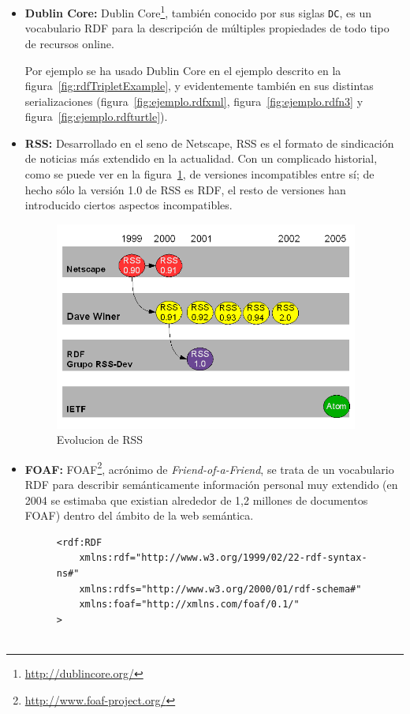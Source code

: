 \begin{itemize}
  \item \textbf{Dublin Core\label{sec:dc}:} Dublin Core\footnote{\url{http://dublincore.org/}}, 
	también conocido por sus siglas \texttt{DC}, es un vocabulario RDF para la descripción 
	de múltiples propiedades de todo tipo de recursos online.

	Por ejemplo se ha usado Dublin Core en el ejemplo descrito en la 
	figura~\ref{fig:rdfTripletExample}, y evidentemente también en sus distintas 
	serializaciones (figura~\ref{fig:ejemplo.rdfxml}, figura~\ref{fig:ejemplo.rdfn3} 
	y figura~\ref{fig:ejemplo.rdfturtle}).

  \item \textbf{RSS:} Desarrollado en el seno de Netscape, RSS es el formato de sindicación de 
	noticias más extendido en la actualidad. Con un complicado historial, como se puede ver 
	en la figura~\ref{fig:rssEvolution}, de versiones incompatibles entre sí; de hecho sólo 
	la versión 1.0 de RSS es RDF, el resto de versiones han introducido ciertos aspectos
	incompatibles.

	\begin{figure}[H]
		\centering
		\includegraphics[width=10cm]{images/rssEvolution.png}
		\caption{Evolucion de RSS}
		\label{fig:rssEvolution}
	\end{figure}

  \item \textbf{FOAF:} FOAF\footnote{\url{http://www.foaf-project.org/}}, acrónimo de 
	\emph{Friend-of-a-Friend}, se trata de un vocabulario RDF para describir 
	semánticamente información personal muy extendido (en 2004 se estimaba\cite{Li2005} 
	que existian alrededor de 1,2 millones de documentos FOAF) dentro del ámbito 
	de la web semántica.

\begin{figure} [H]
\lstset{language=RDF}
\begin{lstlisting}
<rdf:RDF
	xmlns:rdf="http://www.w3.org/1999/02/22-rdf-syntax-ns#"
	xmlns:rdfs="http://www.w3.org/2000/01/rdf-schema#"
	xmlns:foaf="http://xmlns.com/foaf/0.1/"
>


\end{lstlisting}
\end{figure}
\end{itemize}
